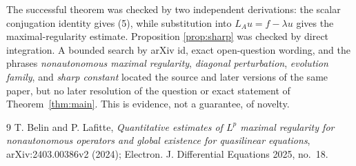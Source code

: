 \documentclass[11pt]{article}
\begin{document}
The successful theorem was checked by two independent derivations: the
scalar conjugation identity gives (5), while substitution into
$L_Au=f-\lambda u$ gives the maximal-regularity estimate.  Proposition
\ref{prop:sharp} was checked by direct integration.  A bounded search by
arXiv id, exact open-question wording, and the phrases \emph{nonautonomous
maximal regularity}, \emph{diagonal perturbation}, \emph{evolution family},
and \emph{sharp constant} located the source and later versions of the same
paper, but no later resolution of the question or exact statement of
Theorem~\ref{thm:main}.  This is evidence, not a guarantee, of novelty.

\begin{thebibliography}{9}
T. Belin and P. Lafitte,
\emph{Quantitative estimates of $L^p$ maximal regularity for nonautonomous
operators and global existence for quasilinear equations},
arXiv:2403.00386v2 (2024); Electron. J. Differential Equations 2025, no.~18.
\end{thebibliography}
\end{document}
